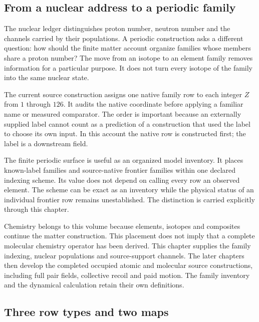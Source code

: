 \label{sec:vii-elements}

\subsection{From a nuclear address to a periodic family}

The nuclear ledger distinguishes proton number, neutron number and the channels carried by their populations. A periodic construction asks a different question: how should the finite matter account organize families whose members share a proton number? The move from an isotope to an element family removes information for a particular purpose. It does not turn every isotope of the family into the same nuclear state.

The current source construction assigns one native family row to each integer $Z$ from $1$ through $126$. It audits the native coordinate before applying a familiar name or measured comparator. The order is important because an externally supplied label cannot count as a prediction of a construction that used the label to choose its own input. In this account the native row is constructed first; the label is a downstream field.\cite{viisama,viireview}

The finite periodic surface is useful as an organized model inventory. It places known-label families and source-native frontier families within one declared indexing scheme. Its value does not depend on calling every row an observed element. The scheme can be exact as an inventory while the physical status of an individual frontier row remains unestablished. The distinction is carried explicitly through this chapter.

Chemistry belongs to this volume because elements, isotopes and composites continue the matter construction. This placement does not imply that a complete molecular chemistry operator has been derived. This chapter supplies the family indexing, nuclear populations and source-support channels. The later chapters then develop the completed occupied atomic and molecular source constructions, including full pair fields, collective recoil and paid motion. The family inventory and the dynamical calculation retain their own definitions.

\subsection{Three row types and two maps}

